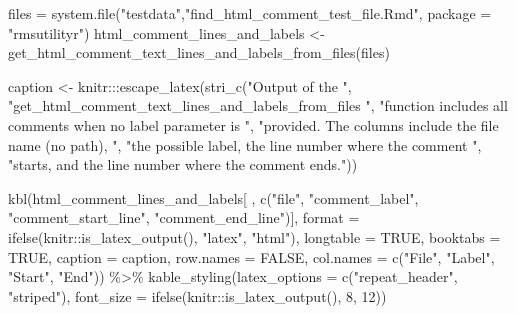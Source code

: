 \documentclass[
]{article}
\newenvironment{Shaded}{\begin{snugshade}}{\end{snugshade}}
\newcommand{\AttributeTok}[1]{\textcolor[rgb]{0.77,0.63,0.00}{#1}}
\newcommand{\ConstantTok}[1]{\textcolor[rgb]{0.00,0.00,0.00}{#1}}
\newcommand{\DecValTok}[1]{\textcolor[rgb]{0.00,0.00,0.81}{#1}}
\newcommand{\FunctionTok}[1]{\textcolor[rgb]{0.00,0.00,0.00}{#1}}
\newcommand{\NormalTok}[1]{#1}
\newcommand{\OtherTok}[1]{\textcolor[rgb]{0.56,0.35,0.01}{#1}}
\newcommand{\SpecialCharTok}[1]{\textcolor[rgb]{0.00,0.00,0.00}{#1}}
\newcommand{\StringTok}[1]{\textcolor[rgb]{0.31,0.60,0.02}{#1}}
\begin{document}
\begin{Shaded}
\begin{Highlighting}[]
\NormalTok{files }\OtherTok{=} \FunctionTok{system.file}\NormalTok{(}\StringTok{"testdata"}\NormalTok{,}\StringTok{"find\_html\_comment\_test\_file.Rmd"}\NormalTok{, }
                       \AttributeTok{package =} \StringTok{"rmsutilityr"}\NormalTok{)}
\NormalTok{html\_comment\_lines\_and\_labels }\OtherTok{\textless{}{-}} 
  \FunctionTok{get\_html\_comment\_text\_lines\_and\_labels\_from\_files}\NormalTok{(files)}

\NormalTok{caption }\OtherTok{\textless{}{-}} 
\NormalTok{  knitr}\SpecialCharTok{:::}\FunctionTok{escape\_latex}\NormalTok{(}\FunctionTok{stri\_c}\NormalTok{(}\StringTok{"Output of the "}\NormalTok{, }
         \StringTok{"get\_html\_comment\_text\_lines\_and\_labels\_from\_files "}\NormalTok{,}
         \StringTok{"function includes all comments when no \textquotesingle{}label\textquotesingle{} parameter is "}\NormalTok{, }
         \StringTok{"provided. The columns include the file name (no path), "}\NormalTok{,}
         \StringTok{"the possible label, the line number where the comment "}\NormalTok{,}
         \StringTok{"starts, and the line number where the comment ends."}\NormalTok{))}


 \FunctionTok{kbl}\NormalTok{(html\_comment\_lines\_and\_labels[ , }\FunctionTok{c}\NormalTok{(}\StringTok{"file"}\NormalTok{, }\StringTok{"comment\_label"}\NormalTok{, }
                                            \StringTok{"comment\_start\_line"}\NormalTok{, }
                                            \StringTok{"comment\_end\_line"}\NormalTok{)],}
     \AttributeTok{format =} \FunctionTok{ifelse}\NormalTok{(knitr}\SpecialCharTok{::}\FunctionTok{is\_latex\_output}\NormalTok{(), }\StringTok{"latex"}\NormalTok{, }\StringTok{"html"}\NormalTok{),}
     \AttributeTok{longtable =} \ConstantTok{TRUE}\NormalTok{, }\AttributeTok{booktabs =} \ConstantTok{TRUE}\NormalTok{,}
     \AttributeTok{caption =}\NormalTok{ caption,}
     \AttributeTok{row.names =} \ConstantTok{FALSE}\NormalTok{,}
     \AttributeTok{col.names =} \FunctionTok{c}\NormalTok{(}\StringTok{"File"}\NormalTok{, }\StringTok{"Label"}\NormalTok{, }\StringTok{"Start"}\NormalTok{, }\StringTok{"End"}\NormalTok{)) }\SpecialCharTok{\%\textgreater{}\%}
   \FunctionTok{kable\_styling}\NormalTok{(}\AttributeTok{latex\_options =} \FunctionTok{c}\NormalTok{(}\StringTok{"repeat\_header"}\NormalTok{, }\StringTok{"striped"}\NormalTok{), }
                 \AttributeTok{font\_size =} \FunctionTok{ifelse}\NormalTok{(knitr}\SpecialCharTok{::}\FunctionTok{is\_latex\_output}\NormalTok{(), }\DecValTok{8}\NormalTok{, }\DecValTok{12}\NormalTok{))}
\end{Highlighting}
\end{Shaded}
\end{document}
